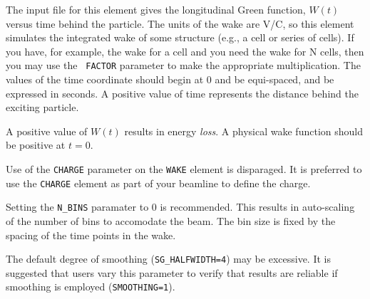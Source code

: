 The input file for this element gives the longitudinal Green function,
$W(t)$ versus time behind the particle. The units of the wake are V/C,
so this element simulates the integrated wake of some structure (e.g.,
a cell or series of cells).  If you have, for example, the wake for a
cell and you need the wake for N cells, then you may use the {\tt
FACTOR} parameter to make the appropriate multiplication.  The values
of the time coordinate should begin at 0 and be equi-spaced, and be expressed in seconds.
A positive value of time represents the distance behind the exciting
particle.  

A positive value of $W(t)$ results in energy {\em loss}.  A physical
wake function should be positive at $t=0$.

Use of the {\tt CHARGE} parameter on the {\tt WAKE} element is
disparaged.  It is preferred to use the {\tt CHARGE} element as part
of your beamline to define the charge.  

Setting the {\tt N\_BINS} paramater to 0 is recommended.  This results
in auto-scaling of the number of bins to accomodate the beam.  The bin
size is fixed by the spacing of the time points in the wake.

The default degree of smoothing ({\tt SG\_HALFWIDTH=4}) may be excessive.
It is suggested that users vary this parameter to verify that results
are reliable if smoothing is employed ({\tt SMOOTHING=1}).

